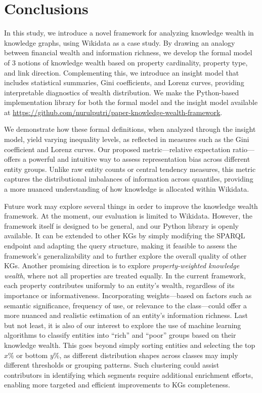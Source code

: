 \section{Conclusions}

In this study, we introduce a novel framework for analyzing knowledge wealth in knowledge graphs, using Wikidata as a case study. By drawing an analogy between financial wealth and information richness, we develop the formal model of 3 notions of knowledge wealth based on property cardinality, property type, and link direction. Complementing this, we introduce an insight model that includes statistical summaries, Gini coefficients, and Lorenz curves, providing interpretable diagnostics of wealth distribution. We make the Python-based implementation library for both the formal model and the insight model available at \url{https://github.com/nurulputri/paper-knowledge-wealth-framework}.

We demonstrate how these formal definitions, when analyzed through the insight model, yield varying inequality levels, as reflected in measures such as the Gini coefficient and Lorenz curves. Our proposed metric—relative expectation ratio—offers a powerful and intuitive way to assess representation bias across different entity groups. Unlike raw entity counts or central tendency measures, this metric captures the distributional imbalances of information across quantiles, providing a more nuanced understanding of how knowledge is allocated within Wikidata.


Future work may explore several things in order to improve the knowledge wealth framework. At the moment, our evaluation is limited to Wikidata. However, the framework itself is designed to be general, and our Python library is openly available. It can be extended to other KGs by simply modifying the SPARQL endpoint and adapting the query structure, making it feasible to assess the framework’s generalizability and to further explore the overall quality of other KGs. Another promising direction is to explore \textit{property-weighted knowledge wealth}, where not all properties are treated equally. In the current framework, each property contributes uniformly to an entity’s wealth, regardless of its importance or informativeness. Incorporating weights—based on factors such as semantic significance, frequency of use, or relevance to the class—could offer a more nuanced and realistic estimation of an entity's information richness. Last but not least, it is also of our interest to explore the use of machine learning algorithms to classify entities into “rich” and “poor” groups based on their knowledge wealth. This goes beyond simply sorting entities and selecting the top \(x\%\) or bottom \(y\%\), as different distribution shapes across classes may imply different thresholds or grouping patterns. Such clustering could assist contributors in identifying which segments require additional enrichment efforts, enabling more targeted and efficient improvements to KGs completeness.

